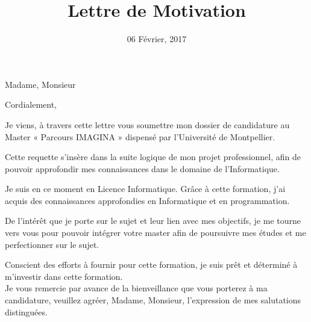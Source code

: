 \documentclass[12pt,a4paper,sans]{moderncv}
\title{Lettre de Motivation}
\begin{document}
\date{06 Février, 2017}
\opening{Madame, Monsieur}
\closing{Cordialement,}
\makelettertitle

Je viens, à travers cette lettre vous soumettre mon dossier de candidature au Master « Parcours IMAGINA » dispensé par l'Université de Montpellier.

Cette requette s’insère dans la suite logique de mon projet professionnel, afin de pouvoir approfondir mes connaissances dans le domaine de l'Informatique.
 
Je suis en ce moment en Licence Informatique. Grâce à cette formation, j'ai acquis des connaissances approfondies en Informatique et en programmation.

De l'intérêt que je porte sur le sujet et leur lien avec mes objectifs, je me tourne vers vous pour pouvoir intégrer votre master afin de poursuivre mes études et me perfectionner sur le sujet.

Conscient des efforts à fournir pour cette formation, je suis prêt et déterminé à m'investir dans cette  formation. \\
Je vous remercie par avance de la bienveillance que vous porterez à ma candidature, veuillez agréer, Madame, Monsieur, l’expression de mes salutations distinguées.

\makeletterclosing
\end{document}
